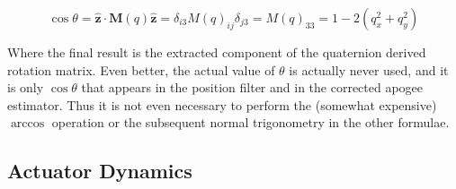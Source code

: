\documentclass{article}
\renewcommand{\vec}{\boldsymbol} %
\newcommand{\mat}{\vec}
\newcommand{\uvec}[1]{\vec{\hat{#1}}}
\begin{document}
	\begin{equation}
		\cos\theta = \uvec{z} \cdot \mat{M}(q)\uvec{z} = \delta_{i3} M(q)_{ij} \delta_{j3} = M(q)_{33} = 1-2\left(q_x^2+q_y^2\right)
	\end{equation} 
	
	Where the final result is the extracted component of the quaternion derived rotation matrix.  Even better, the actual value of $\theta$ is actually never used, and it is only $\cos\theta$ that appears in the position filter and in the corrected apogee estimator.  Thus it is not even necessary to perform the (somewhat expensive) $\arccos$ operation or the subsequent normal trigonometry in the other formulae.
	
	\subsection{Actuator Dynamics}
	
	
	
\end{document}

